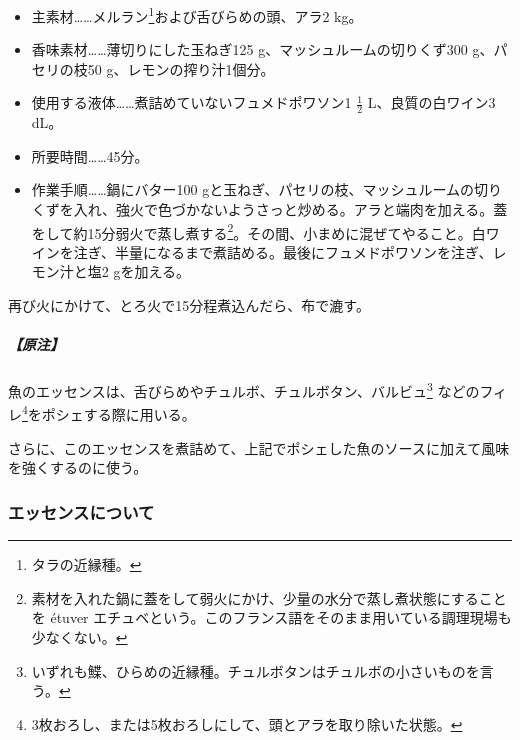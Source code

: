 \begin{recette}


\begin{itemize}
\item
  主素材\ldots{}\ldots{}メルラン\footnote{タラの近縁種。}および舌びらめの頭、アラ2
  kg。
\item
  香味素材\ldots{}\ldots{}薄切りにした玉ねぎ125
  g、マッシュルームの切りくず300 g、パセリの枝50
  g、レモンの搾り汁1個分。
\item
  使用する液体\ldots{}\ldots{}煮詰めていないフュメドポワソン1
  \(\frac{1}{2}\) L、良質の白ワイン3 dL。
\item
  所要時間\ldots{}\ldots{}45分。
\item
  作業手順\ldots{}\ldots{}鍋にバター100
  gと玉ねぎ、パセリの枝、マッシュルームの切りくずを入れ、強火で色づかないようさっと炒める。アラと端肉を加える。蓋をして約15分弱火で蒸し煮する\footnote{素材を入れた鍋に蓋をして弱火にかけ、少量の水分で蒸し煮状態にすることを
    étuver
    エチュベという。このフランス語をそのまま用いている調理現場も少なくない。}。その間、小まめに混ぜてやること。白ワインを注ぎ、半量になるまで煮詰める。最後にフュメドポワソンを注ぎ、レモン汁と塩2
  gを加える。
\end{itemize}

再び火にかけて、とろ火で15分程煮込んだら、布で漉す。

\hypertarget{nota-essence-de-poisson}{%
\subparagraph{【原注】}\label{nota-essence-de-poisson}}

魚のエッセンスは、舌びらめやチュルボ、チュルボタン、バルビュ\footnote{いずれも鰈、ひらめの近縁種。チュルボタンはチュルボの小さいものを言う。}
などのフィレ\footnote{3枚おろし、または5枚おろしにして、頭とアラを取り除いた状態。}をポシェする際に用いる。

さらに、このエッセンスを煮詰めて、上記でポシェした魚のソースに加えて風味を強くするのに使う。

\hypertarget{essences-diverses}{%
\subsubsection{エッセンスについて}\label{essences-diverses}}




\end{recette}
